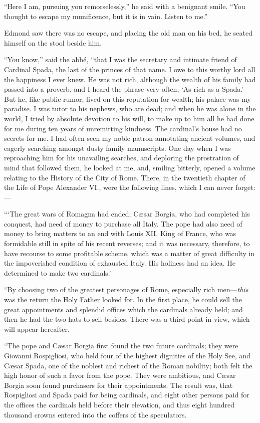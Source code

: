 “Here I am, pursuing you remorselessly,” he said with a benignant
smile. “You thought to escape my munificence, but it is in vain. Listen
to me.”

Edmond saw there was no escape, and placing the old man on his bed, he
seated himself on the stool beside him.

“You know,” said the abbé, “that I was the secretary and intimate
friend of Cardinal Spada, the last of the princes of that name. I owe
to this worthy lord all the happiness I ever knew. He was not rich,
although the wealth of his family had passed into a proverb, and I
heard the phrase very often, ‘As rich as a Spada.’ But he, like public
rumor, lived on this reputation for wealth; his palace was my paradise.
I was tutor to his nephews, who are dead; and when he was alone in the
world, I tried by absolute devotion to his will, to make up to him all
he had done for me during ten years of unremitting kindness. The
cardinal’s house had no secrets for me. I had often seen my noble
patron annotating ancient volumes, and eagerly searching amongst dusty
family manuscripts. One day when I was reproaching him for his
unavailing searches, and deploring the prostration of mind that
followed them, he looked at me, and, smiling bitterly, opened a volume
relating to the History of the City of Rome. There, in the twentieth
chapter of the Life of Pope Alexander VI., were the following lines,
which I can never forget:—

“‘The great wars of Romagna had ended; Cæsar Borgia, who had completed
his conquest, had need of money to purchase all Italy. The pope had
also need of money to bring matters to an end with Louis XII. King of
France, who was formidable still in spite of his recent reverses; and
it was necessary, therefore, to have recourse to some profitable
scheme, which was a matter of great difficulty in the impoverished
condition of exhausted Italy. His holiness had an idea. He determined
to make two cardinals.’

“By choosing two of the greatest personages of Rome, especially rich
men—\textit{this} was the return the Holy Father looked for. In the first
place, he could sell the great appointments and splendid offices which
the cardinals already held; and then he had the two hats to sell
besides. There was a third point in view, which will appear hereafter.

“The pope and Cæsar Borgia first found the two future cardinals; they
were Giovanni Rospigliosi, who held four of the highest dignities of
the Holy See, and Cæsar Spada, one of the noblest and richest of the
Roman nobility; both felt the high honor of such a favor from the pope.
They were ambitious, and Cæsar Borgia soon found purchasers for their
appointments. The result was, that Rospigliosi and Spada paid for being
cardinals, and eight other persons paid for the offices the cardinals
held before their elevation, and thus eight hundred thousand crowns
entered into the coffers of the speculators.

